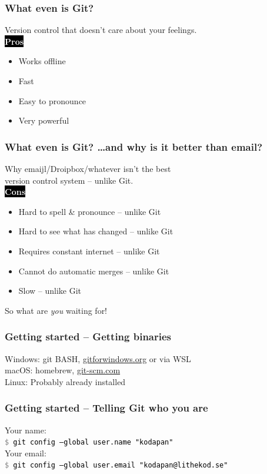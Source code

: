 \documentclass{beamer}
\newcommand{\keyword}[1]{\hspace{-1.0em}\colorbox{black}{\textcolor{white}{\textbf{#1}\vphantom{Ep}}}\vspace{0.2em}} %
\newcommand{\command}[1]{\colorbox{black!90!white!10!}{\vphantom{Ep}\texttt{\textcolor{gray}{\$} \textcolor{black}{#1}}}}
\begin{document}
\begin{frame}[fragile]
  \frametitle{What even is Git?}

  Version control that doesn't care about your feelings. \\

  \vspace{1em}
  \keyword{Pros}
  \begin{itemize}
    \item Works offline
    \item Fast
    \item Easy to pronounce
    \item Very powerful
  \end{itemize}

\end{frame}

\begin{frame}[fragile]
  \frametitle{What even is Git? \dots and why is it better than email?}

  Why emaijl/Droipbox/whatever isn't the best \\
  version control system -- unlike Git.\\
  \vspace{1em}
  \keyword{Cons}
  \begin{itemize}[<+->]
    \item Hard to spell \& pronounce -- unlike Git
    \item Hard to see what has changed -- unlike Git
    \item Requires constant internet -- unlike Git
    \item Cannot do automatic merges  -- unlike Git
    \item Slow -- unlike Git
  \end{itemize}
  \vspace{1em}
  
  So what are \emph{you} waiting for!
\end{frame}

\begin{frame}[fragile]
  \frametitle{Getting started -- Getting binaries}
  
  Windows: git BASH, \url{gitforwindows.org} or via WSL\\
  macOS: homebrew, \url{git-scm.com}\\
  Linux: Probably already installed\\

\end{frame}

\begin{frame}[fragile]
  \frametitle{Getting started -- Telling Git who you are}

  Your name:\\
  \command{git config --global user.name "kodapan"} \\[1em]

  Your email:\\
  \command{git config --global user.email "kodapan@lithekod.se"} \\

\end{frame}
\end{document}
